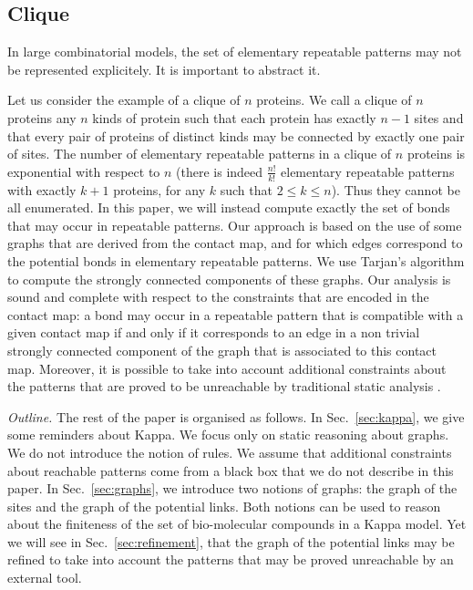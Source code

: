 \documentclass{entcs}
\begin{document}
\subsection{Clique}

In large combinatorial models, the set of elementary repeatable patterns
may not be represented explicitely. It is important to abstract it.

Let us consider the example of a clique of $n$ proteins.
We call a clique of $n$ proteins any $n$ kinds of protein such that each protein has exactly $n-1$ sites and that every pair of proteins of distinct kinds may be connected by exactly one pair of sites. The number of elementary repeatable patterns in a clique of $n$ proteins  is exponential with respect to $n$ (there is indeed $\frac{n!}{k!}$  elementary repeatable patterns with exactly $k+1$ proteins, for any $k$ such that $2\leq k \leq n$).
Thus they cannot be all enumerated. In this paper, we will instead compute exactly the set of bonds that may occur in repeatable patterns.
Our approach is based on the use of some graphs that are derived from the contact map, and for which edges correspond to the potential bonds in elementary repeatable patterns. We use Tarjan's algorithm \cite{tarjan} to compute the strongly connected components of these graphs. Our analysis is sound and complete with respect to the constraints that are encoded in the contact map: a bond may occur in a repeatable pattern that is compatible with a given  contact map if and only if it corresponds to an edge in a non trivial strongly connected component of the graph that is associated to this contact map. Moreover, it is possible to take into account additional constraints about the patterns that are proved to be unreachable by traditional static analysis \cite{SASB2016,KaSa}.

\emph{Outline.} The rest of the paper is organised as follows.
In Sec.~\ref{sec:kappa}, we give some reminders about Kappa.
We focus only on static reasoning about graphs. We do not introduce the notion of rules. We assume that
additional constraints about reachable patterns come from a black box that we do not describe in this paper. In Sec.~\ref{sec:graphs}, we introduce two notions of graphs: the graph of the sites and the graph of the potential links. Both notions can be used to reason about the finiteness of the set of bio-molecular compounds in a Kappa model. Yet we will see in Sec.~\ref{sec:refinement}, that the graph of the potential links may be refined to take into account the patterns that may be proved unreachable by an external tool.
\end{document}
